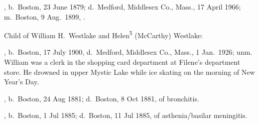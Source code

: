 \begin{Kids}
	, b.\ Boston, 23 June 1879;\cite{Helen5McCarthyBirth} d.\ Medford, Middlesex Co., Mass., 17 April 1966;\cite{Helen5McCarthyDeath} m.\ Boston, 9 Aug.\ 1899, .\cite{Helen5McCarthyMarriage}

\begin{GrandkidsIntro}
	Child of William H.\ Westlake and Helen\textsuperscript{5} (McCarthy) Westlake:
\end{GrandkidsIntro}

\begin{Grandkids}
	, b.\ Boston, 17 July 1900,\cite{William5WestlakeBirth} d.\ Medford, Middlesex Co., Mass., 1 Jan.\ 1926; unm.\cite{William5WestlakeDeath} William was a clerk in the shopping card department at Filene's department store. He drowned in upper Mystic Lake while ice skating on the morning of New Year's Day.\cite{William5WestlakeDeath}
\end{Grandkids}

	, b.\ Boston, 24 Aug 1881;\cite{John5McCarthyBirth} d.\ Boston, 8 Oct 1881, of bronchitis.\cite{John5McCarthyDeath}
	
	, b.\ Boston, 1 Jul 1885;\cite{William5McCarthyBirth} d.\ Boston, 11 Jul 1885, of asthenia/basilar meningitis.\cite{William5McCarthyDeath}

\end{Kids}


